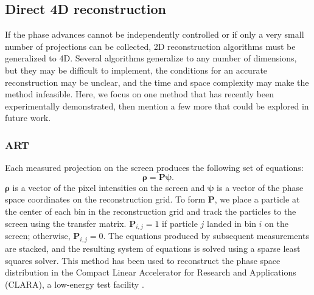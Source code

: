 \subsection{Direct 4D reconstruction}

If the phase advances cannot be independently controlled or if only a very small number of projections can be collected, 2D reconstruction algorithms must be generalized to 4D. Several algorithms generalize to any number of dimensions, but they may be difficult to implement, the conditions for an accurate reconstruction may be unclear, and the time and space complexity may make the method infeasible. Here, we focus on one method that has recently been experimentally demonstrated, then mention a few more that could be explored in future work.


\subsubsection{ART}

Each measured projection on the screen produces the following set of equations:
%
\begin{equation}\label{eq:art}
    \bm{\rho} = \mathbf{P} \bm{\psi}.
\end{equation}
%
$\bm{\rho}$ is a vector of the pixel intensities on the screen and $\bm{\psi}$ is a vector of the phase space coordinates on the reconstruction grid. To form $\mathbf{P}$, we place a particle at the center of each bin in the reconstruction grid and track the particles to the screen using the transfer matrix. $\mathbf{P}_{i, j} = 1$ if particle $j$ landed in bin $i$ on the screen; otherwise, $\mathbf{P}_{i, j} = 0$. The equations produced by subsequent measurements are stacked, and the resulting system of equations is solved using a sparse least squares solver. This method has been used to reconstruct the phase space distribution in the Compact Linear Accelerator for Research and Applications (CLARA), a low-energy test facility \cite{Wolski2020}.

